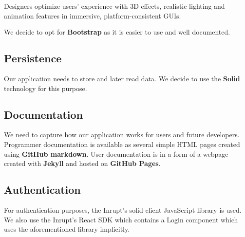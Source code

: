   Designers optimize users' experience with 3D effects, realistic lighting and animation features in immersive, platform-consistent GUIs.

  We decide to opt for \textbf{Bootstrap} as it is easier to use and well documented.

\subsection*{Persistence}
Our application needs to store and later read data.
We decide to use the \textbf{Solid} technology for this purpose. 

\subsection*{Documentation}
We need to capture how our application works for users and future developers.
Programmer documentation is available as several simple HTML pages created using \textbf{GitHub markdown}.
User documentation is in a form of a webpage created with \textbf{Jekyll} and hosted on \textbf{GitHub Pages}.

\subsection*{Authentication}
For authentication purposes, the Inrupt's solid-client JavaScript library is used.
We also use the Inrupt's React SDK which contains a Login component which uses the aforementioned library implicitly.

